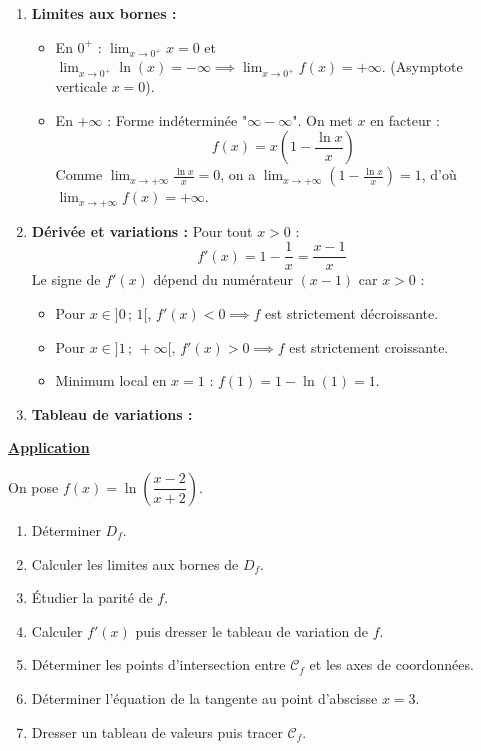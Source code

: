 \documentclass[12pt,a4paper]{article}
\begin{document}
\begin{enumerate}
    \item \textbf{Limites aux bornes :}
    \begin{itemize}
        \item En $0^+$ : $\lim_{x \to 0^+} x = 0$ et $\lim_{x \to 0^+} \ln(x) = -\infty \implies \lim_{x \to 0^+} f(x) = +\infty$. (Asymptote verticale $x = 0$).
        \item En $+\infty$ : Forme indéterminée "$\infty - \infty$". On met $x$ en facteur :
        \[
        f(x) = x \left(1 - \frac{\ln x}{x}\right)
        \]
        Comme $\lim_{x \to +\infty} \frac{\ln x}{x} = 0$, on a $\lim_{x \to +\infty} \left(1 - \frac{\ln x}{x}\right) = 1$, d'où $\lim_{x \to +\infty} f(x) = +\infty$.
    \end{itemize}

    \item \textbf{Dérivée et variations :}
    Pour tout $x > 0$ :
    \[
    f'(x) = 1 - \frac{1}{x} = \frac{x - 1}{x}
    \]
    Le signe de $f'(x)$ dépend du numérateur $(x - 1)$ car $x > 0$ :
    \begin{itemize}
        \item Pour $x \in ]0 \,;\, 1[$, $f'(x) < 0 \implies f$ est strictement décroissante.
        \item Pour $x \in ]1 \,;\, +\infty[$, $f'(x) > 0 \implies f$ est strictement croissante.
        \item Minimum local en $x = 1$ : $f(1) = 1 - \ln(1) = 1$.
    \end{itemize}

    \item \textbf{Tableau de variations :}
    \begin{center}
    \end{center}
\end{enumerate}


\underline{\textbf{Application }}

\vspace{0.3cm}

On pose $f(x) = \ln\left(\dfrac{x - 2}{x + 2}\right)$.

\begin{enumerate}
    \item Déterminer $D_f$.
    \item Calculer les limites aux bornes de $D_f$.
    \item Étudier la parité de $f$.
    \item Calculer $f'(x)$ puis dresser le tableau de variation de $f$.
    \item Déterminer les points d'intersection entre $\mathcal{C}_f$ et les axes de coordonnées.
    \item Déterminer l'équation de la tangente au point d'abscisse $x = 3$.
    \item Dresser un tableau de valeurs puis tracer $\mathcal{C}_f$.
\end{enumerate}
\end{document}
